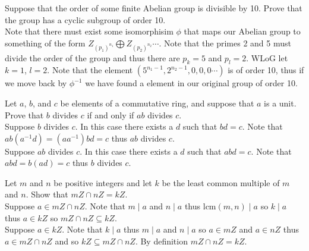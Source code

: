 \documentclass[12pt]{article}
\makeatletter
\theoremstyle{homework}
\newenvironment{exercise}[1]
{\def\@currentlabel{#1}\exercisecore}
{\endexercisecore}
\makeatother
\begin{document}
\begin{exercise}{11.12}
Suppose that the order of some finite Abelian group is divisible by 10. Prove that the group has a cyclic subgroup of order 10.\\
Note that there must exist some isomorphisim $\phi$ that maps our Abelian group to something of the form $Z_{(p_1)^{n_1}}\bigoplus Z_{(p_2)^{n_2}}\cdots$.  Note that the primes 2 and 5 must divide the order of the group and thus there are $p_k=5$ and $p_l=2$.  WLoG let $k=1$, $l=2$.  Note that the element $(5^{n_1-1},2^{n_2-1},0,0,0\cdots )$ is of order 10, thus if we move back by $\phi^{-1}$ we have found a element in our original group of order 10.
\end{exercise}

\begin{exercise}{12.12}
Let $a$, $b$, and $c$ be elements of a commutative ring, and suppose that $a$ is a unit. Prove that $b$ divides $c$ if and only if $ab$ divides $c$.\\
Suppose $b$ divides $c$.  In this case there exists a $d$ such that $bd=c$.  Note that $ab(a^{-1}d)=(aa^{-1})bd=c$ thus $ab$ divides $c$.\\
Suppose $ab$ divides $c$.  In this case there exists a $d$ such that $abd=c$.  Note that $abd=b(ad)=c$ thus $b$ divides $c$.\\
\end{exercise}

\begin{exercise}{12.36}
Let $m$ and $n$ be positive integers and let $k$ be the least common multiple of $m$ and $n$. Show that $mZ \cap nZ = kZ$.\\
Suppose $a\in mZ \cap nZ$.  Note that $m\mid a$ and $n\mid a$ thus $\text{lcm}(m,n)\mid a$ so $k\mid a$ thus $a\in kZ$ so $mZ \cap nZ \subseteq kZ$.\\
Suppose $a\in kZ$.  Note that $k\mid a$ thus $m\mid a$ and $n\mid a$ so $a\in mZ$ and $a\in nZ$ thus $a\in mZ \cap nZ$ and so $kZ\subseteq mZ \cap nZ$.  By definition $mZ \cap nZ = kZ$.
\end{exercise}
\end{document}
